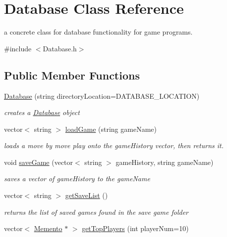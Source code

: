 \hypertarget{classDatabase}{
\section{Database Class Reference}
\label{classDatabase}
}


a concrete class for database functionality for game programs.  


{\ttfamily \#include $<$Database.h$>$}\subsection*{Public Member Functions}
\begin{DoxyCompactItemize}
\item 
\hyperlink{classDatabase_af6c74356771bb4fab7f650c538b69082}{Database} (string directoryLocation=DATABASE\_\-LOCATION)
\begin{DoxyCompactList}\small\item\em creates a \hyperlink{classDatabase}{Database} object \item\end{DoxyCompactList}\item 
vector$<$ string $>$ \hyperlink{classDatabase_aefebb94db8894a40bd3fbd691c1d034c}{loadGame} (string gameName)
\begin{DoxyCompactList}\small\item\em loads a move by move play onto the gameHistory vector, then returns it. \item\end{DoxyCompactList}\item 
void \hyperlink{classDatabase_ab7769733153f13a11257401ed7b2bf23}{saveGame} (vector$<$ string $>$ gameHistory, string gameName)
\begin{DoxyCompactList}\small\item\em saves a vector of gameHistory to the gameName \item\end{DoxyCompactList}\item 
vector$<$ string $>$ \hyperlink{classDatabase_af77269e1ad834ae1d9d2e694cc5f6b7b}{getSaveList} ()
\begin{DoxyCompactList}\small\item\em returns the list of saved games found in the save game folder \item\end{DoxyCompactList}\item 
vector$<$ \hyperlink{classMemento}{Memento} $\ast$ $>$ \hyperlink{classDatabase_ae91622236a16acaf9d27ff73940f84f3}{getTopPlayers} (int playerNum=10)

\end{DoxyCompactItemize}

